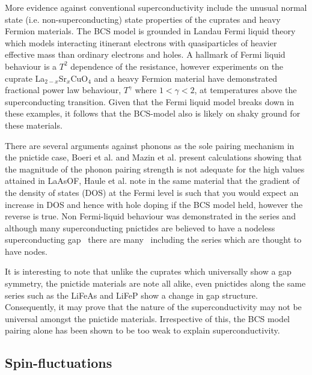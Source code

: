 More evidence against conventional superconductivity include the unusual normal state (i.e. non-superconducting) state properties of the cuprates and heavy Fermion materials. The \ac{BCS} model is grounded in Landau Fermi liquid theory which models interacting itinerant electrons with quasiparticles of heavier effective mass than ordinary electrons and holes. A hallmark of Fermi liquid behaviour is a $T^2$ dependence of the resistance, however experiments on the cuprate La$_{2-x}$Sr$_{x}$CuO$_4$\cite{Cooper2009} and a heavy Fermion material\cite{Custers2003} have demonstrated fractional power law behaviour, $T^\gamma$ where $1 < \gamma < 2$, at temperatures above the superconducting transition. Given that the Fermi liquid model breaks down in these examples, it follows that the \ac{BCS}-model also is likely on shaky ground for these materials.

There are several arguments against phonons as the sole pairing mechanism in the pnictide case, Boeri et al.\cite{Boeri2008} and Mazin et al.\cite{Mazin2008} present calculations showing that the magnitude of the phonon pairing strength is not adequate for the high \Tc values attained in LaAsOF, Haule et al.\cite{Haule2008} note in the same material that the gradient of the density of states (DOS) at the Fermi level is such that you would expect an increase in DOS and hence \Tc with hole doping if the \ac{BCS} model held, however the reverse is true. Non Fermi-liquid behaviour was demonstrated in the \BaFePAs series\cite{Jiang2009,Kasahara2010} and although many superconducting pnictides are believed to have a nodeless superconducting gap~\cite{Hashimoto2012,Zhang2011a,Ding2008, Terashima2009} there are many~\cite{Fletcher2009, Qiu2011b, Song2011, Dong2010, Hashimoto2012} including the \BaFePAs series\cite{Zhang2011,Yamashita2011a,Suzuki2011} which are thought to have nodes.

It is interesting to note that unlike the cuprates which universally show a \DxTwoyTwo gap symmetry, the pnictide materials are note all alike, even pnictides along the same series such as the LiFeAs and LiFeP show a change in gap structure. Consequently, it may prove that the nature of the superconductivity may not be universal amongst the pnictide materials. Irrespective of this, the \ac{BCS} model pairing alone has been shown to be too weak to explain \highTc superconductivity.


\subsection{Spin-fluctuations}

